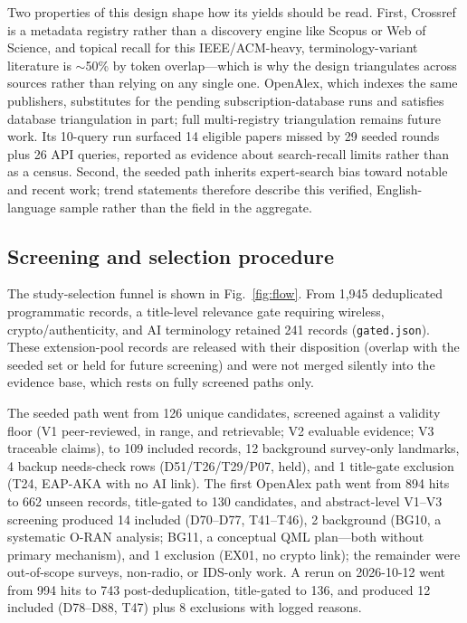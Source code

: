 \documentclass[11pt,a4paper]{article}
\begin{document}
Two properties of this design shape how its yields should be read. First, Crossref is a metadata registry rather than a discovery engine like Scopus or Web of Science, and topical recall for this IEEE/ACM-heavy, terminology-variant literature is $\sim$50\% by token overlap---which is why the design triangulates across sources rather than relying on any single one. OpenAlex, which indexes the same publishers, substitutes for the pending subscription-database runs and satisfies database triangulation in part; full multi-registry triangulation remains future work. Its 10-query run surfaced 14 eligible papers missed by 29 seeded rounds plus 26 API queries, reported as evidence about search-recall limits rather than as a census. Second, the seeded path inherits expert-search bias toward notable and recent work; trend statements therefore describe this verified, English-language sample rather than the field in the aggregate.

\subsection{Screening and selection procedure}
The study-selection funnel is shown in Fig.~\ref{fig:flow}. From 1,945 deduplicated programmatic records, a title-level relevance gate requiring wireless, crypto/authenticity, and AI terminology retained 241 records (\texttt{gated.json}). These extension-pool records are released with their disposition (overlap with the seeded set or held for future screening) and were not merged silently into the evidence base, which rests on fully screened paths only.

The seeded path went from 126 unique candidates, screened against a validity floor (V1 peer-reviewed, in range, and retrievable; V2 evaluable evidence; V3 traceable claims), to 109 included records, 12 background survey-only landmarks, 4 backup needs-check rows (D51/T26/T29/P07, held), and 1 title-gate exclusion (T24, EAP-AKA with no AI link). The first OpenAlex path went from 894 hits to 662 unseen records, title-gated to 130 candidates, and abstract-level V1--V3 screening produced 14 included (D70--D77, T41--T46), 2 background (BG10, a systematic O-RAN analysis; BG11, a conceptual QML plan---both without primary mechanism), and 1 exclusion (EX01, no crypto link); the remainder were out-of-scope surveys, non-radio, or IDS-only work. A rerun on 2026-10-12 went from 994 hits to 743 post-deduplication, title-gated to 136, and produced 12 included (D78--D88, T47) plus 8 exclusions with logged reasons.
\end{document}
